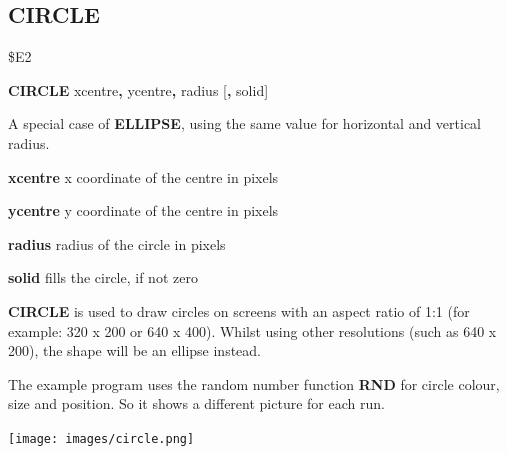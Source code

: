 
\newpage
\subsection{CIRCLE}
\begin{description}[leftmargin=2cm,style=nextline]
\item [Token:] \$E2
\item [Format:] {\bf CIRCLE} xcentre{\bf,} ycentre{\bf,} radius [{\bf,} solid]
\item [Usage:] A special case of
               {\bf ELLIPSE}, using the same value for
               horizontal and vertical radius.

               {\bf xcentre} x coordinate of the centre in pixels

               {\bf ycentre} y coordinate of the centre in pixels

               {\bf radius} radius of the circle in pixels

               {\bf solid} fills the circle, if not zero

\item [Remarks:] {\bf CIRCLE} is used to draw circles on
               screens with an aspect ratio of 1:1 (for example: 320 x 200
               or 640 x 400). Whilst using other resolutions (such as 640 x 200),
               the shape will be an ellipse instead.

               The example program uses the random number function
               {\bf RND} for circle colour, size and position.
               So it shows a different picture for each run.

\item \begin{center}\texttt{[image: images/circle.png]}\end{center}
\newpage


\end{description}
